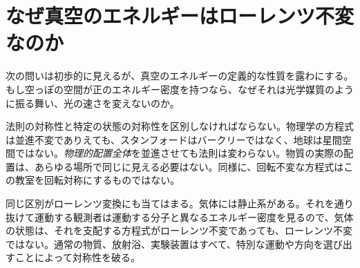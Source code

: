 \begin{classroomqa}
\end{classroomqa}

\begin{classroomqa}
\end{classroomqa}

\section{なぜ真空のエネルギーはローレンツ不変なのか}

次の問いは初歩的に見えるが、真空のエネルギーの定義的な性質を露わにする。もし空っぽの空間が正のエネルギー密度を持つなら、なぜそれは光学媒質のように振る舞い、光の速さを変えないのか。

\begin{classroomqa}
\end{classroomqa}

法則の対称性と特定の状態の対称性を区別しなければならない。物理学の方程式は並進不変でありえても、スタンフォードはバークリーではなく、地球は星間空間ではない。\emph{物理的配置全体}を並進させても法則は変わらない。物質の実際の配置は、あらゆる場所で同じに見える必要はない。同様に、回転不変な方程式はこの教室を回転対称にするものではない。

同じ区別がローレンツ変換にも当てはまる。気体には静止系がある。それを通り抜けて運動する観測者は運動する分子と異なるエネルギー密度を見るので、気体の状態は、それを支配する方程式がローレンツ不変であっても、ローレンツ不変ではない。通常の物質、放射浴、実験装置はすべて、特別な運動や方向を選び出すことによって対称性を破る。


